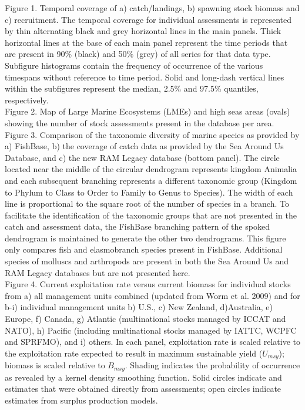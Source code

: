 \documentclass[letterpaper,12pt]{article}
\begin{document}
\noindent Figure 1. Temporal coverage of a) catch/landings, b) spawning stock biomass and c) recruitment. The temporal coverage for individual assessments is represented by thin alternating black and grey horizontal lines in the main panels. Thick horizontal lines at the base of each main panel represent the time periods that are present in 90\% (black) and 50\% (grey) of all series for that data type. Subfigure histograms contain the frequency of occurrence of the various timespans without reference to time period. Solid and long-dash vertical lines within the subfigures represent the median, 2.5\% and 97.5\% quantiles, respectively.
\\

\noindent Figure 2. Map of Large Marine Ecosystems (LMEs) and high seas areas (ovals) showing the number of stock assessments present in the database per area. 
\\

\noindent Figure 3. Comparison of the taxonomic diversity of marine species as provided by a)
FishBase, b) the coverage of catch data as provided by the Sea Around Us
Database, and c) the new RAM Legacy database (bottom panel). The circle
located near the middle of the circular dendrogram represents kingdom Animalia and
each subsequent branching represents a different taxonomic group (Kingdom to Phylum
to Class to Order to Family to Genus to Species). The width of each line is proportional
to the square root of the number of species in a branch. To facilitate the identification
of the taxonomic groups that are not presented in the catch and assessment data, the
FishBase branching pattern of the spoked dendrogram is maintained to generate the
other two dendrograms. This figure only compares fish and elasmobranch species present in FishBase. Additional species of molluscs and arthropods are present in both the Sea Around Us and RAM Legacy databases but are not presented here.
\\

\noindent Figure 4.  Current exploitation rate versus current biomass for individual stocks from a) all management units combined (updated from Worm et al. 2009) and for b-i) individual management units b) U.S., c) New Zealand, d)Australia, e) Europe, f) Canada, g) Atlantic (multinational stocks managed by ICCAT and NATO), h) Pacific (including multinational stocks managed by IATTC, WCPFC and SPRFMO), and i) others. In each panel, exploitation rate is scaled relative to the exploitation rate expected to result in maximum sustainable yield ($U_{msy}$); biomass is scaled relative to $B_{msy}$. Shading indicates the probability of occurrence as revealed by a kernel density smoothing function. Solid circles indicate and estimates that were obtained directly from assessments; open circles indicate estimates from surplus production models. 
\\
\end{document}
